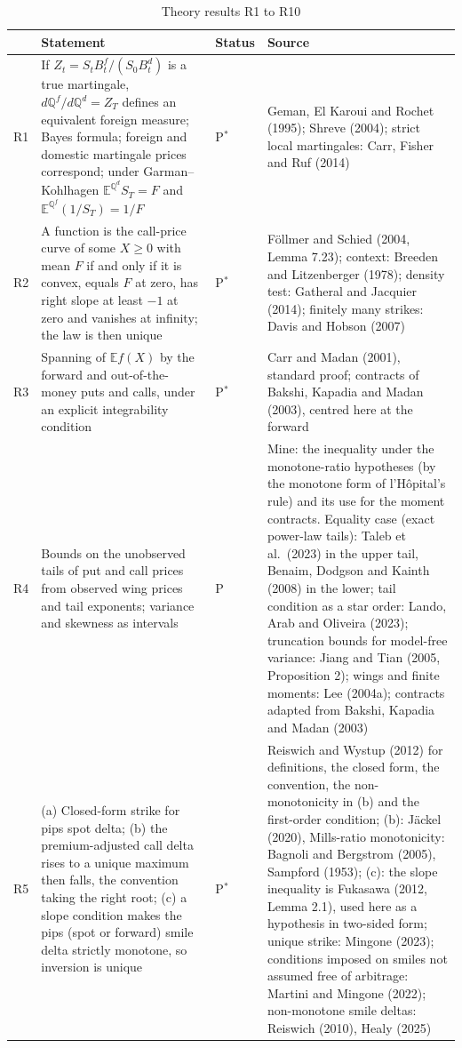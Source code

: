 \documentclass[11pt]{article}
\theoremstyle{result}
\newcommand{\E}{\mathbb{E}}
\newcommand{\Q}{\mathbb{Q}}
\begin{document}
\begin{table}[H]
\centering\footnotesize
\caption{Theory results R1 to R10}\label{tab:theory}
\begin{tabularx}{\linewidth}{@{}l>{\raggedright\arraybackslash}X>{\raggedright\arraybackslash}p{1.55cm}>{\raggedright\arraybackslash}X@{}}
\toprule
 & Statement & Status & Source \\
\midrule
R1 & If $Z_t=S_tB^f_t/(S_0B^d_t)$ is a true martingale, $d\Q^f/d\Q^d=Z_T$ defines an equivalent foreign measure; Bayes formula; foreign and domestic martingale prices correspond; under Garman--Kohlhagen $\E^{\Q^d}S_T=F$ and $\E^{\Q^f}(1/S_T)=1/F$ & P$^*$ & Geman, El Karoui and Rochet (1995); Shreve (2004); strict local martingales: Carr, Fisher and Ruf (2014) \\
R2 & A function is the call-price curve of some $X\ge0$ with mean $F$ if and only if it is convex, equals $F$ at zero, has right slope at least $-1$ at zero and vanishes at infinity; the law is then unique & P$^*$ & F\"ollmer and Schied (2004, Lemma 7.23); context: Breeden and Litzenberger (1978); density test: Gatheral and Jacquier (2014); finitely many strikes: Davis and Hobson (2007) \\
R3 & Spanning of $\E f(X)$ by the forward and out-of-the-money puts and calls, under an explicit integrability condition & P$^*$ & Carr and Madan (2001), standard proof; contracts of Bakshi, Kapadia and Madan (2003), centred here at the forward \\
R4 & Bounds on the unobserved tails of put and call prices from observed wing prices and tail exponents; variance and skewness as intervals & P & Mine: the inequality under the monotone-ratio hypotheses (by the monotone form of l'H\^opital's rule) and its use for the moment contracts. Equality case (exact power-law tails): Taleb et al.\ (2023) in the upper tail, Benaim, Dodgson and Kainth (2008) in the lower; tail condition as a star order: Lando, Arab and Oliveira (2023); truncation bounds for model-free variance: Jiang and Tian (2005, Proposition 2); wings and finite moments: Lee (2004a); contracts adapted from Bakshi, Kapadia and Madan (2003) \\
R5 & (a) Closed-form strike for pips spot delta; (b) the premium-adjusted call delta rises to a unique maximum then falls, the convention taking the right root; (c) a slope condition makes the pips (spot or forward) smile delta strictly monotone, so inversion is unique & P$^*$ & Reiswich and Wystup (2012) for definitions, the closed form, the convention, the non-monotonicity in (b) and the first-order condition; (b): J\"ackel (2020), Mills-ratio monotonicity: Bagnoli and Bergstrom (2005), Sampford (1953); (c): the slope inequality is Fukasawa (2012, Lemma 2.1), used here as a hypothesis in two-sided form; unique strike: Mingone (2023); conditions imposed on smiles not assumed free of arbitrage: Martini and Mingone (2022); non-monotone smile deltas: Reiswich (2010), Healy (2025) \\
\bottomrule
\end{tabularx}
\end{table}
\end{document}
